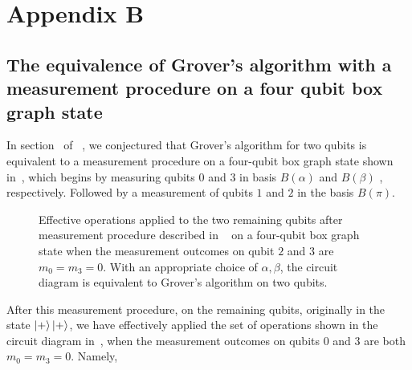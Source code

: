 \chapter{Appendix B}

\section{The equivalence of Grover's algorithm with a measurement procedure on a four qubit box graph state}

In section~ of ~, we conjectured that Grover's algorithm for two qubits is equivalent to a measurement procedure on a four-qubit box graph state shown in~, which begins by measuring qubits $0$ and $3$ in basis $B(\alpha)$ and $B(\beta)$ , respectively. Followed by a measurement of qubits $1$ and $2$ in the basis $B(\pi)$.

\begin{figure}[h]
	\centering
	\caption[Effective operations applied to the two remaining qubits after measurement procedure described in ~\protect{} on a four-qubit box graph state.]{Effective operations applied to the two remaining qubits after measurement procedure described in ~\protect{} on a four-qubit box graph state when the measurement outcomes on qubit $2$ and $3$ are $m_0=m_3=0$. With an appropriate choice of $\alpha,\beta$, the circuit diagram is equivalent to Grover's algorithm on two qubits.}
\end{figure}

\noindent
After this measurement procedure, on the remaining qubits, originally in the state $\ket{+}\ket{+}$, we have effectively applied the set of operations shown in the circuit diagram in~, when the measurement outcomes on qubits $0$ and $3$ are both $m_0 = m_3 = 0$. Namely,

